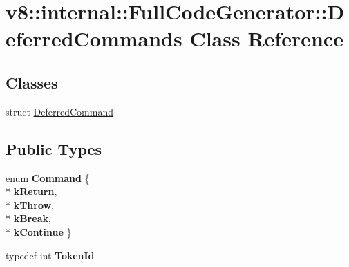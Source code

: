 \hypertarget{classv8_1_1internal_1_1_full_code_generator_1_1_deferred_commands}{}\section{v8\+:\+:internal\+:\+:Full\+Code\+Generator\+:\+:Deferred\+Commands Class Reference}
\label{classv8_1_1internal_1_1_full_code_generator_1_1_deferred_commands}
\subsection*{Classes}
\begin{DoxyCompactItemize}
\item 
struct \hyperlink{structv8_1_1internal_1_1_full_code_generator_1_1_deferred_commands_1_1_deferred_command}{Deferred\+Command}
\end{DoxyCompactItemize}
\subsection*{Public Types}
\begin{DoxyCompactItemize}
\item 
enum {\bfseries Command} \{ \\*
{\bfseries k\+Return}, 
\\*
{\bfseries k\+Throw}, 
\\*
{\bfseries k\+Break}, 
\\*
{\bfseries k\+Continue}
 \}\hypertarget{classv8_1_1internal_1_1_full_code_generator_1_1_deferred_commands_a9a199efb66b0e960fbbaac689d122d74}{}\label{classv8_1_1internal_1_1_full_code_generator_1_1_deferred_commands_a9a199efb66b0e960fbbaac689d122d74}

\item 
typedef int {\bfseries Token\+Id}\hypertarget{classv8_1_1internal_1_1_full_code_generator_1_1_deferred_commands_a589b57ae3ee02e14b187c326facc6853}{}\label{classv8_1_1internal_1_1_full_code_generator_1_1_deferred_commands_a589b57ae3ee02e14b187c326facc6853}

\end{DoxyCompactItemize}
